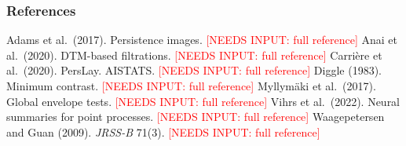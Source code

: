 \documentclass[twoside]{article}
\newcommand{\NI}[1]{\textcolor{red}{[NEEDS INPUT: #1]}}
\begin{document}
\begin{table}[t]
\caption{[PLACEHOLDER — Parameter-estimation error per family and estimator, overall and in regime, with minimum
contrast.]}
\label{tab:estimation}
\end{table}

\begin{table}[t]
\caption{[PLACEHOLDER — Paired effect of adding persistent-homology features on estimation, classification and
end-to-end fidelity.]}
\label{tab:ph}
\end{table}

\subsubsection*{References}
\begin{thebibliography}{}
\setlength{\itemindent}{-\leftmargin}
\makeatletter\renewcommand{\@biblabel}[1]{}\makeatother
\bibitem{} Adams et al.\ (2017). Persistence images. \NI{full reference}
\bibitem{} Anai et al.\ (2020). DTM-based filtrations. \NI{full reference}
\bibitem{} Carri\`ere et al.\ (2020). PersLay. AISTATS. \NI{full reference}
\bibitem{} Diggle (1983). Minimum contrast. \NI{full reference}
\bibitem{} Myllym\"aki et al.\ (2017). Global envelope tests. \NI{full reference}
\bibitem{} Vihrs et al.\ (2022). Neural summaries for point processes. \NI{full reference}
\bibitem{} Waagepetersen and Guan (2009). \emph{JRSS-B} 71(3). \NI{full reference}
\end{thebibliography}
\end{document}
